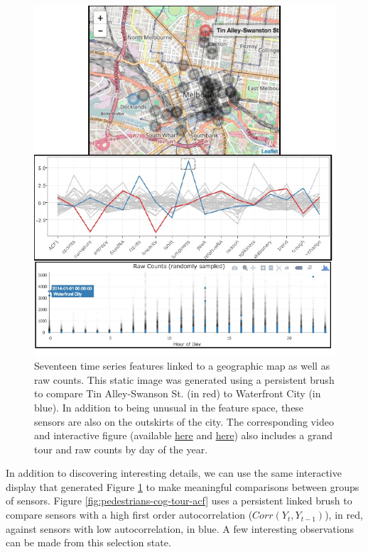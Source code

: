 \documentclass[12pt,]{article}
\theoremstyle{definition}
\theoremstyle{definition}
\theoremstyle{remark}
\begin{document}
\begin{figure}
\centering
\includegraphics{images/pedestrians-cog-tour.pdf}
\caption{\label{fig:pedestrians-cog-tour}Seventeen time series features
linked to a geographic map as well as raw counts. This static image was
generated using a persistent brush to compare Tin Alley-Swanson St. (in
red) to Waterfront City (in blue). In addition to being unusual in the
feature space, these sensors are also on the outskirts of the city. The
corresponding video and interactive figure (available
\href{https://vimeo.com/192710308}{here} and
\href{http://cpsievert.github.io/pedestrians/cog-tour/}{here}) also
includes a grand tour and raw counts by day of the year.}
\end{figure}

In addition to discovering interesting details, we can use the same
interactive display that generated Figure \ref{fig:pedestrians-cog-tour}
to make meaningful comparisons between groups of sensors. Figure
\ref{fig:pedestrians-cog-tour-acf} uses a persistent linked brush to
compare sensors with a high first order autocorrelation
(\(Corr(Y_t, Y_{t-1})\)), in red, against sensors with low
autocorrelation, in blue. A few interesting observations can be made
from this selection state.
\end{document}
